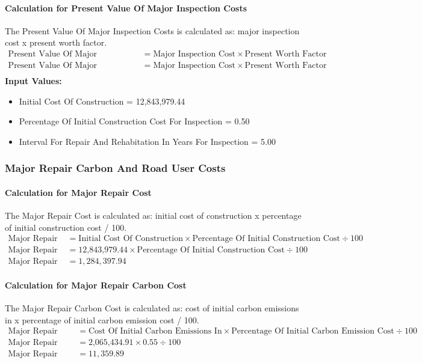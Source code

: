 \documentclass{article}
\begin{document}
 \paragraph{Calculation for Present Value Of Major Inspection Costs} 
The Present Value Of Major Inspection Costs is calculated as: major inspection cost x present worth factor.
\begin{align*}
 \text{Present Value Of Major Inspection Costs} &= \text{Major Inspection Cost} \times \text{Present Worth Factor} \\
 \text{Present Value Of Major Inspection Costs} &= \text{Major Inspection Cost} \times \text{Present Worth Factor} \\
\end{align*}
\textbf{Input Values:}
\begin{itemize}
\item Initial Cost Of Construction = 12,843,979.44
\item Percentage Of Initial Construction Cost For Inspection = 0.50
\item Interval For Repair And Rehabitation In Years For Inspection = 5.00
\end{itemize}
\subsubsection{Major Repair Carbon And Road User Costs}
 \paragraph{Calculation for Major Repair Cost} 
The Major Repair Cost is calculated as: initial cost of construction x percentage of initial construction cost / 100.
\begin{align*}
 \text{Major Repair Cost} &= \text{Initial Cost Of Construction} \times \text{Percentage Of Initial Construction Cost} \div 100 \\
 \text{Major Repair Cost} &= \text{12,843,979.44} \times \text{Percentage Of Initial Construction Cost} \div 100 \\
 \text{Major Repair Cost} &= 1,284,397.94 
\end{align*}
 \paragraph{Calculation for Major Repair Carbon Cost} 
The Major Repair Carbon Cost is calculated as: cost of initial carbon emissions in x percentage of initial carbon emission cost / 100.
\begin{align*}
 \text{Major Repair Carbon Cost} &= \text{Cost Of Initial Carbon Emissions In} \times \text{Percentage Of Initial Carbon Emission Cost} \div 100 \\
 \text{Major Repair Carbon Cost} &= \text{2,065,434.91} \times 0.55 \div 100 \\
 \text{Major Repair Carbon Cost} &= 11,359.89 
\end{align*}
\end{document}
